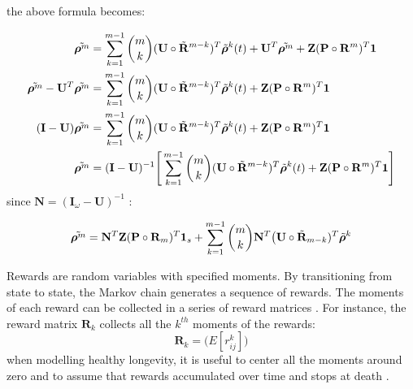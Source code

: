 \documentclass[\main/main.tex]{subfiles}
\begin{document}
the above formula becomes:


\begin{equation}\label{mom2}
\begin{split}
     \Tilde{\bm{\rho}^m} &= \sum_{k=1}^{m-1} {m \choose k}(\mathbf{U} \circ \Tilde{\mathbf{R}}^{m-k}) ^T \Tilde{\bm{\rho}}^k(t) + \mathbf{U}^T \Tilde{\bm{\rho}^m}  + \mathbf{Z} (\mathbf{P} \circ \mathbf{R}^{m}) ^ T \bm{1}\\
     \Tilde{\bm{\rho}^m} -\mathbf{U}^T \Tilde{\bm{\rho}^m} &= \sum_{k=1}^{m-1} {m \choose k}(\mathbf{U} \circ \Tilde{\mathbf{R}}^{m-k}) ^T \Tilde{\bm{\rho}}^k(t) + \mathbf{Z} (\mathbf{P} \circ \mathbf{R}^{m}) ^ T \bm{1}  \\
     (\mathbf{I} - \mathbf{U}) \Tilde{\bm{\rho}^m} &= \sum_{k=1}^{m-1} {m \choose k}(\mathbf{U} \circ \Tilde{\mathbf{R}}^{m-k}) ^T \Tilde{\bm{\rho}}^k(t) + \mathbf{Z} (\mathbf{P} \circ \mathbf{R}^{m}) ^ T \bm{1}  \\
     \Tilde{\bm{\rho}^m} &= (\mathbf{I} - \mathbf{U})^{-1} \Bigg[ \sum_{k=1}^{m-1} {m \choose k}(\mathbf{U} \circ \Tilde{\mathbf{R}}^{m-k}) ^T \Tilde{\bm{\rho}}^k(t) + \mathbf{Z} (\mathbf{P} \circ \mathbf{R}^{m}) ^ T \bm{1} \Bigg]
\end{split}
    \end{equation}
since $\mathbf{N} = (\mathbf{I}_\omega - \mathbf{U})^{-1}$ \cite{Caswell2018}:

\begin{equation}
     \Tilde{\bm{\rho}^m} = \mathbf{N}^T\mathbf{Z} (\mathbf{P} \circ \mathbf{R}_m)^T \bm{1}_s + \sum_{k=1}^{m-1} \binom{m}{k} \mathbf{N}^T \big( \mathbf{U} \circ \Tilde{\mathbf{R}}_{m-k})^T  \Tilde{\bm{\rho}}^k 
\end{equation}



































Rewards are random variables with specified moments. By transitioning from state to state, the Markov chain generates a sequence of rewards. The moments of each reward can be collected in a series of reward matrices \citep{Caswell2018}. For instance, the reward matrix $\mathbf{R}_k$ collects all the $k^{th}$ moments of the rewards:
\begin{equation}
\mathbf{R}_k = \big( E[r^k_{ij}] \big)
\end{equation}
when modelling healthy longevity, it is useful to center all the moments around zero and to assume that rewards accumulated over time and stops at death \citep{Caswell2018}.\\
\end{document}
